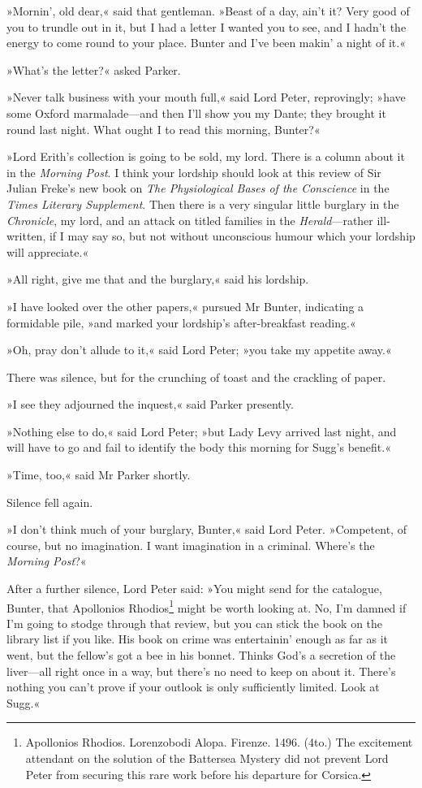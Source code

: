 »Mornin', old dear,« said that gentleman. »Beast of a day, ain't it? Very good of you to trundle out in it, but I had a letter I wanted you to see, and I hadn't the energy to come round to your place. Bunter and I've been makin' a night of it.«

»What's the letter?« asked Parker.

»Never talk business with your mouth full,« said Lord Peter, reprovingly; »have some Oxford marmalade—and then I'll show you my Dante; they brought it round last night. What ought I to read this morning, Bunter?«

»Lord Erith's collection is going to be sold, my lord. There is a column about it in the \textit{Morning Post}. I think your lordship should look at this review of Sir Julian Freke's new book on \textit{The Physiological Bases of the Conscience} in the \textit{Times Literary Supplement}. Then there is a very singular little burglary in the \textit{Chronicle}, my lord, and an attack on titled families in the \textit{Herald}---rather ill-written, if I may say so, but not without unconscious humour which your lordship will appreciate.«

»All right, give me that and the burglary,« said his lordship.

»I have looked over the other papers,« pursued Mr Bunter, indicating a formidable pile, »and marked your lordship's after-breakfast reading.«

»Oh, pray don't allude to it,« said Lord Peter; »you take my appetite away.«

There was silence, but for the crunching of toast and the crackling of paper.

»I see they adjourned the inquest,« said Parker presently.

»Nothing else to do,« said Lord Peter; »but Lady Levy arrived last night, and will have to go and fail to identify the body this morning for Sugg's benefit.«

»Time, too,« said Mr Parker shortly.

Silence fell again.

»I don't think much of your burglary, Bunter,« said Lord Peter. »Competent, of course, but no imagination. I want imagination in a criminal. Where's the \textit{Morning Post}?«

After a further silence, Lord Peter said: »You might send for the catalogue, Bunter, that Apollonios Rhodios\footnote{Apollonios Rhodios. Lorenzobodi Alopa. Firenze. 1496. (4to.) The excitement attendant on the solution of the Battersea Mystery did not prevent Lord Peter from securing this rare work before his departure for Corsica.} might be worth looking at. No, I'm damned if I'm going to stodge through that review, but you can stick the book on the library list if you like. His book on crime was entertainin' enough as far as it went, but the fellow's got a bee in his bonnet. Thinks God's a secretion of the liver—all right once in a way, but there's no need to keep on about it. There's nothing you can't prove if your outlook is only sufficiently limited. Look at Sugg.«

